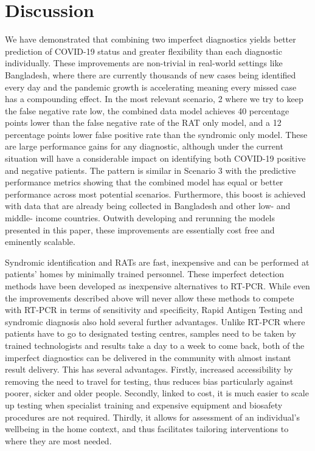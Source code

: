 \documentclass[]{elsarticle} %
\begin{document}
\hypertarget{discussion}{%
\section{Discussion}\label{discussion}}

We have demonstrated that combining two imperfect diagnostics yields
better prediction of COVID-19 status and greater flexibility than each
diagnostic individually. These improvements are non-trivial in
real-world settings like Bangladesh, where there are currently thousands
of new cases being identified every day and the pandemic growth is
accelerating meaning every missed case has a compounding effect. In the
most relevant scenario, 2 where we try to keep the false negative rate
low, the combined data model achieves 40 percentage points lower than
the false negative rate of the RAT only model, and a 12 percentage
points lower false positive rate than the syndromic only model. These
are large performance gains for any diagnostic, although under the
current situation will have a considerable impact on identifying both
COVID-19 positive and negative patients. The pattern is similar in
Scenario 3 with the predictive performance metrics showing that the
combined model has equal or better performance across most potential
scenarios. Furthermore, this boost is achieved with data that are
already being collected in Bangladesh and other low- and middle- income
countries. Outwith developing and rerunning the models presented in this
paper, these improvements are essentially cost free and eminently
scalable.

Syndromic identification and RATs are fast, inexpensive and can be
performed at patients' homes by minimally trained personnel. These
imperfect detection methods have been developed as inexpensive
alternatives to RT-PCR. While even the improvements described above will
never allow these methods to compete with RT-PCR in terms of sensitivity
and specificity, Rapid Antigen Testing and syndromic diagnosis also hold
several further advantages. Unlike RT-PCR where patients have to go to
designated testing centres, samples need to be taken by trained
technologists and results take a day to a week to come back, both of the
imperfect diagnostics can be delivered in the community with almost
instant result delivery. This has several advantages. Firstly, increased
accessibility by removing the need to travel for testing, thus reduces
bias particularly against poorer, sicker and older people. Secondly,
linked to cost, it is much easier to scale up testing when specialist
training and expensive equipment and biosafety procedures are not
required. Thirdly, it allows for assessment of an individual's wellbeing
in the home context, and thus facilitates tailoring interventions to
where they are most needed.
\end{document}
